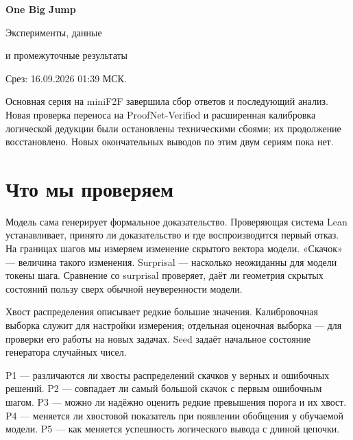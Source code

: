 \documentclass[11pt,a4paper]{article}
\begin{document}
\begin{center}
{\LARGE\sffamily\bfseries One Big Jump\par}
\vspace{0.4em}
{\Large\sffamily Эксперименты, данные\par и промежуточные результаты\par}
\end{center}

Срез: 16.09.2026 01:39 МСК.

Основная серия на miniF2F завершила сбор ответов и последующий анализ. Новая проверка переноса на ProofNet-Verified и расширенная калибровка логической дедукции были остановлены техническими сбоями; их продолжение восстановлено. Новых окончательных выводов по этим двум сериям пока нет.

\section{Что мы проверяем}
Модель сама генерирует формальное доказательство. Проверяющая система Lean устанавливает, принято ли доказательство и где воспроизводится первый отказ. На границах шагов мы измеряем изменение скрытого вектора модели. «Скачок» — величина такого изменения. Surprisal — насколько неожиданны для модели токены шага. Сравнение со surprisal проверяет, даёт ли геометрия скрытых состояний пользу сверх обычной неуверенности модели.

Хвост распределения описывает редкие большие значения. Калибровочная выборка служит для настройки измерения; отдельная оценочная выборка — для проверки его работы на новых задачах. Seed задаёт начальное состояние генератора случайных чисел.

P1 — различаются ли хвосты распределений скачков у верных и ошибочных решений. P2 — совпадает ли самый большой скачок с первым ошибочным шагом. P3 — можно ли надёжно оценить редкие превышения порога и их хвост. P4 — меняется ли хвостовой показатель при появлении обобщения у обучаемой модели. P5 — как меняется успешность логического вывода с длиной цепочки.
\end{document}

